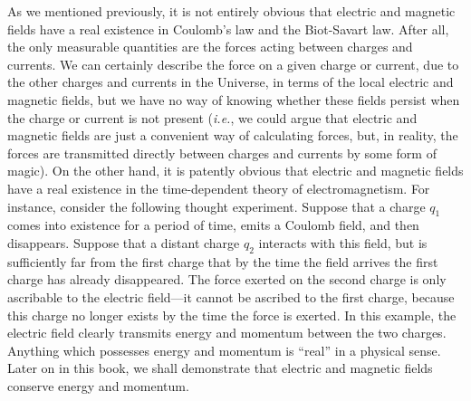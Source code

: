 As we mentioned previously, it is not entirely obvious that electric and magnetic fields
have a real existence  in Coulomb's law and the Biot-Savart law. After all, the only measurable quantities are the forces acting  between charges and
currents. We can certainly describe the force  on a given charge or current, due to the other charges
and currents in the Universe, 
in terms of the local electric and magnetic fields, but we have no way of knowing whether these
fields persist when the charge or current is not present ({\em i.e.}, we could argue that electric and
magnetic fields are just a convenient way of calculating  forces, but, in reality, the forces
are transmitted directly between charges and currents by some form  of magic).
On the other hand, it is patently obvious that 
electric and magnetic fields have a real existence in the time-dependent theory of electromagnetism. For instance, consider the following thought experiment.
Suppose that a charge $q_1$ comes into existence for a period of time, emits a Coulomb
field, and then disappears. Suppose that a distant charge $q_2$ interacts with this field,
but is sufficiently far from the first charge that by the time the field arrives the
first charge has already disappeared. The force exerted on the second charge is only ascribable
to the electric field---it cannot be ascribed to the first charge, because this charge no longer exists
by the time the force is exerted. In this example, the electric field clearly  transmits energy and momentum
between the two charges. Anything which possesses energy and momentum is ``real'' in a physical
sense. Later on in this book, we shall demonstrate that electric and magnetic  fields conserve
energy and momentum. 

